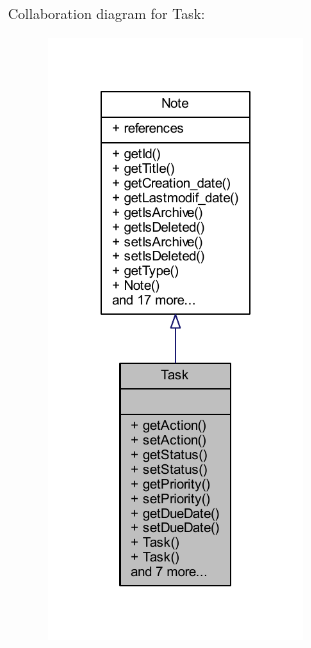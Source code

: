 Collaboration diagram for Task\+:
\nopagebreak
\begin{figure}[H]
\begin{center}
\leavevmode
\includegraphics[width=191pt]{class_task__coll__graph}
\end{center}
\end{figure}
